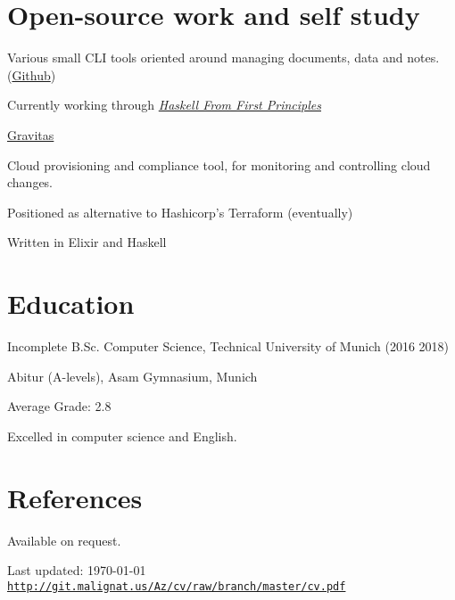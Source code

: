 \documentclass[a4paper]{article}
\def\footerlink{http://git.malignat.us/Az/cv/raw/branch/master/cv.pdf}
\renewenvironment{itemize}{
  \begin{list}{}{
    \setlength{\leftmargin}{1.5em}
  }
}{
  \end{list}
}
\newenvironment{packed}{
\begin{itemize}
  \setlength{\itemsep}{0pt}
  \setlength{\parskip}{0pt}
  \setlength{\parsep}{0pt}
}{\end{itemize}}
\begin{document}
\section*{Open-source work and self study}

\begin{itemize}
  \item Various small CLI tools oriented around managing documents, data and
    notes. (\href{https://github.com/MordecaiMalignatus?utf8=\%E2\%9C\%93\&tab=repositories\&q=\&type=public\&language=}{Github})
  \item Currently working through \href{http://haskellbook.com}{\emph{Haskell From First Principles}}
\item \href{https://github.com/LivewareProblems/gravitas}{Gravitas}
  \begin{packed}
    \item Cloud provisioning and compliance tool, for monitoring and controlling
      cloud changes.
    \item Positioned as alternative to Hashicorp's Terraform (eventually)
    \item Written in Elixir and Haskell
  \end{packed}
\end{itemize}

\section*{Education}

\begin{itemize}
  \item Incomplete B.Sc. Computer Science, Technical University of Munich (2016
    {\textendash} 2018)

  \item Abitur (A-levels), Asam Gymnasium, Munich
	\begin{packed}
	\item Average Grade: 2.8
	\item Excelled in computer science and English.
	\end{packed}
\end{itemize}


\section*{References}
Available on request.

\vfill

\begin{center}
  \begin{footnotesize}
    Last updated: \today \\
    \href{\footerlink}{\texttt{\footerlink}}
  \end{footnotesize}
\end{center}
\end{document}
